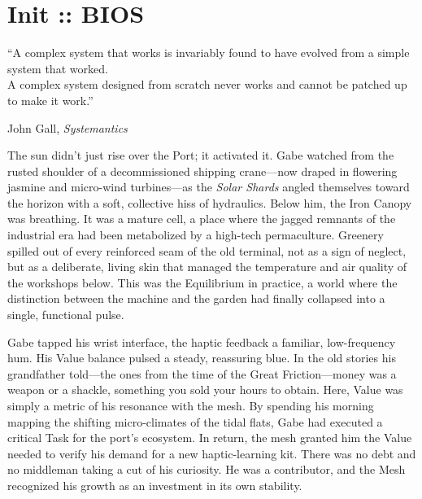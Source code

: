 \chapter{Init :: BIOS}
\label{chap:01}

\epigraph{“A complex system that works is invariably found to have evolved from a simple system that worked.\\A complex system designed from scratch never works and cannot be patched up to make it work.”}{John Gall, \textit{Systemantics}}


The sun didn't just rise over the Port; it activated it. Gabe watched from the rusted shoulder of a decommissioned shipping crane—now draped in flowering jasmine and micro-wind turbines—as the \textit{Solar Shards} angled themselves toward the horizon with a soft, collective hiss of hydraulics. Below him, the Iron Canopy was breathing. It was a mature cell, a place where the jagged remnants of the industrial era had been metabolized by a high-tech permaculture. Greenery spilled out of every reinforced seam of the old terminal, not as a sign of neglect, but as a deliberate, living skin that managed the temperature and air quality of the workshops below. This was the Equilibrium in practice, a world where the distinction between the machine and the garden had finally collapsed into a single, functional pulse.

Gabe tapped his wrist interface, the haptic feedback a familiar, low-frequency hum. His Value balance pulsed a steady, reassuring blue. In the old stories his grandfather told—the ones from the time of the Great Friction—money was a weapon or a shackle, something you sold your hours to obtain. Here, Value was simply a metric of his resonance with the mesh. By spending his morning mapping the shifting micro-climates of the tidal flats, Gabe had executed a critical Task for the port's ecosystem. In return, the mesh granted him the Value needed to verify his demand for a new haptic-learning kit. There was no debt and no middleman taking a cut of his curiosity. He was a contributor, and the Mesh recognized his growth as an investment in its own stability.

